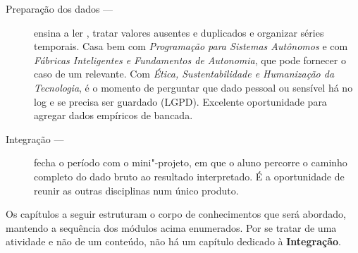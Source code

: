 \begin{description}
	\item[Preparação dos dados ---] ensina a ler , tratar valores ausentes e duplicados e organizar séries temporais. Casa bem com \emph{Programação para Sistemas Autônomos} e com \emph{Fábricas Inteligentes e Fundamentos de Autonomia}, que pode fornecer o caso de um  relevante. Com \emph{Ética, Sustentabilidade e Humanização da Tecnologia}, é o momento de perguntar que dado pessoal ou sensível há no log e se precisa ser guardado (LGPD). Excelente oportunidade para agregar dados empíricos de bancada.
	\item[Integração ---] fecha o período com o mini"-projeto, em que o aluno percorre o caminho completo do dado bruto ao resultado interpretado. É a oportunidade de reunir as outras disciplinas num único produto.
\end{description}

Os capítulos a seguir estruturam o corpo de conhecimentos que será abordado, mantendo a sequência dos módulos acima enumerados. Por se tratar de uma atividade e não de um conteúdo, não há um capítulo dedicado à \textbf{Integração}.
